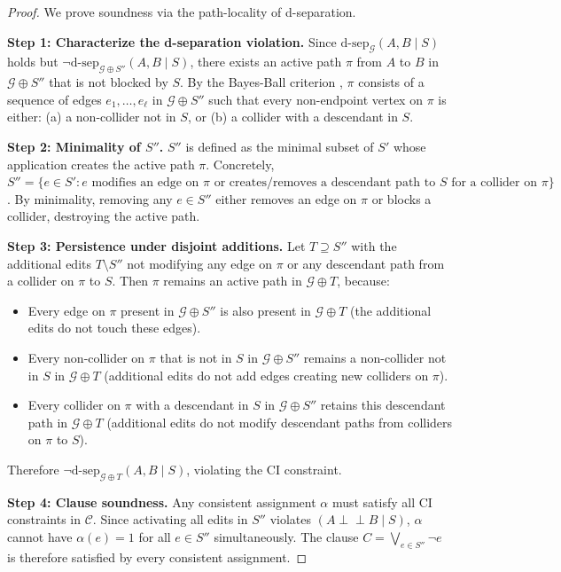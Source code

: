 \documentclass[11pt,a4paper]{article}
\theoremstyle{definition}
\theoremstyle{remark}
\newcommand{\CI}{\perp\!\!\!\perp}
\newcommand{\DAG}{\mathcal{G}}
\newcommand{\dsep}{\mathrm{d\text{-}sep}}
\begin{document}
\begin{proof}
We prove soundness via the path-locality of d-separation.

\textbf{Step 1: Characterize the d-separation violation.}
Since $\dsep_{\DAG}(A, B \mid S)$ holds but
$\neg\dsep_{\DAG \oplus S''}(A, B \mid S)$, there exists an active path
$\pi$ from $A$ to $B$ in $\DAG \oplus S''$ that is not blocked by $S$.
By the Bayes-Ball criterion \cite{shachter1998}, $\pi$ consists of a
sequence of edges $e_1, \ldots, e_\ell$ in $\DAG \oplus S''$ such that
every non-endpoint vertex on $\pi$ is either:
(a) a non-collider not in $S$, or
(b) a collider with a descendant in $S$.

\textbf{Step 2: Minimality of $S''$.}
$S''$ is defined as the minimal subset of $S'$ whose application creates the
active path $\pi$. Concretely, $S'' = \{e \in S' : e \text{ modifies an edge on }
\pi \text{ or creates/removes a descendant path to } S \text{ for a collider on }
\pi\}$. By minimality, removing any $e \in S''$ either removes an edge on $\pi$ or
blocks a collider, destroying the active path.

\textbf{Step 3: Persistence under disjoint additions.}
Let $T \supseteq S''$ with the additional edits $T \setminus S''$ not modifying
any edge on $\pi$ or any descendant path from a collider on $\pi$ to $S$.
Then $\pi$ remains an active path in $\DAG \oplus T$, because:
\begin{itemize}
  \item Every edge on $\pi$ present in $\DAG \oplus S''$ is also present in
    $\DAG \oplus T$ (the additional edits do not touch these edges).
  \item Every non-collider on $\pi$ that is not in $S$ in $\DAG \oplus S''$
    remains a non-collider not in $S$ in $\DAG \oplus T$ (additional edits
    do not add edges creating new colliders on $\pi$).
  \item Every collider on $\pi$ with a descendant in $S$ in $\DAG \oplus S''$
    retains this descendant path in $\DAG \oplus T$ (additional edits do not
    modify descendant paths from colliders on $\pi$ to $S$).
\end{itemize}

Therefore $\neg\dsep_{\DAG \oplus T}(A, B \mid S)$, violating the CI constraint.

\textbf{Step 4: Clause soundness.}
Any consistent assignment $\alpha$ must satisfy all CI constraints in
$\mathcal{C}$. Since activating all edits in $S''$ violates
$(A \CI B \mid S)$, $\alpha$ cannot have $\alpha(e) = 1$ for all
$e \in S''$ simultaneously. The clause $C = \bigvee_{e \in S''} \neg e$
is therefore satisfied by every consistent assignment.


\end{proof}
\end{document}
